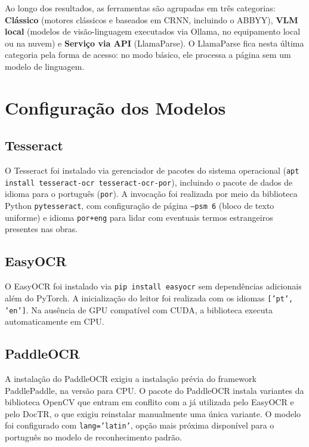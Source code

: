 \documentclass[noabntexcite,oneside]{ufsc-thesis-rn46-2019}
\begin{document}
Ao longo dos resultados, as ferramentas são agrupadas em três categorias: \textbf{Clássico}
(motores clássicos e baseados em CRNN, incluindo o ABBYY), \textbf{VLM local} (modelos de
visão-linguagem executados via Ollama, no equipamento local ou na nuvem) e \textbf{Serviço
via API} (LlamaParse). O LlamaParse fica nesta última categoria pela forma de
acesso: no modo básico, ele processa a página sem um modelo de linguagem.

\section{Configuração dos Modelos}
\label{sec:configuracao}

\subsection{Tesseract}

O Tesseract foi instalado via gerenciador de pacotes do sistema operacional
(\texttt{apt install tesseract-ocr tesseract-ocr-por}), incluindo o pacote de dados de
idioma para o português (\texttt{por}). A invocação foi realizada por meio da biblioteca
Python \texttt{pytesseract}, com configuração de página \texttt{--psm~6} (bloco de texto
uniforme) e idioma \texttt{por+eng} para lidar com eventuais termos estrangeiros presentes
nas obras.

\subsection{EasyOCR}

O EasyOCR foi instalado via \texttt{pip install easyocr} sem dependências adicionais além
do PyTorch. A inicialização do leitor foi realizada com os idiomas \texttt{['pt', 'en']}.
Na ausência de GPU compatível com CUDA, a biblioteca executa automaticamente em CPU.

\subsection{PaddleOCR}

A instalação do PaddleOCR exigiu a instalação prévia do framework PaddlePaddle, na versão
para CPU. O pacote do PaddleOCR instala variantes da biblioteca OpenCV que entram em
conflito com a já utilizada pelo EasyOCR e pelo DocTR, o que exigiu reinstalar manualmente
uma única variante. O modelo foi configurado com \texttt{lang='latin'}, opção mais próxima
disponível para o português no modelo de reconhecimento padrão.
\end{document}
